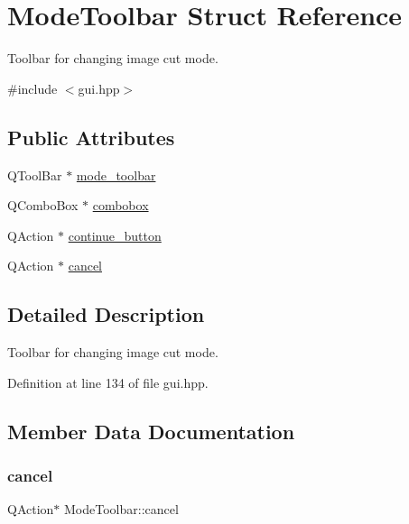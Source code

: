 \hypertarget{structModeToolbar}{}\section{Mode\+Toolbar Struct Reference}
\label{structModeToolbar}


Toolbar for changing image cut mode.  




{\ttfamily \#include $<$gui.\+hpp$>$}

\subsection*{Public Attributes}
\begin{DoxyCompactItemize}
\item 
Q\+Tool\+Bar $\ast$ \mbox{\hyperlink{structModeToolbar_acc6bcdd91825343f34ec38d312418234}{mode\+\_\+toolbar}}
\item 
Q\+Combo\+Box $\ast$ \mbox{\hyperlink{structModeToolbar_ad0ba4f03ef2a44e2543add404a50b4f1}{combobox}}
\item 
Q\+Action $\ast$ \mbox{\hyperlink{structModeToolbar_af7d7766f5b1710abb382c42689e963ca}{continue\+\_\+button}}
\item 
Q\+Action $\ast$ \mbox{\hyperlink{structModeToolbar_a814fa4aec4ff40543904dfc4aa4c8e89}{cancel}}
\end{DoxyCompactItemize}


\subsection{Detailed Description}
Toolbar for changing image cut mode. 

Definition at line 134 of file gui.\+hpp.



\subsection{Member Data Documentation}
\mbox{\label{structModeToolbar_a814fa4aec4ff40543904dfc4aa4c8e89}} 
\subsubsection{\texorpdfstring{cancel}{cancel}}
{\footnotesize\ttfamily Q\+Action$\ast$ Mode\+Toolbar\+::cancel}

